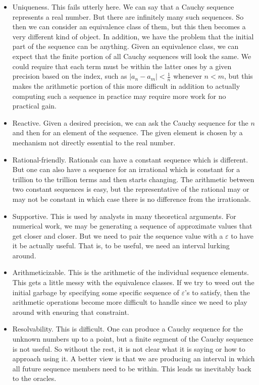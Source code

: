 \documentclass[12pt]{article}
\theoremstyle{remark}
\begin{document}
\begin{itemize}
    \item Uniqueness. This fails utterly here. We can say that a Cauchy sequence represents a real number. But there are infinitely many such sequences. So then we can consider an equivalence class of them, but this then becomes a very different kind of object. In addition, we have the problem that the initial part of the sequence can be anything. Given an equivalence class, we can expect that the finite portion of all Cauchy sequences will look the same. We could require that each term must be within the latter ones by a given precision based on the index, such as $|a_n - a_m| < \tfrac{1}{n}$ whenever $n < m$, but this makes the arithmetic portion of this more difficult in addition to actually computing such a sequence in practice may require more work for no practical gain. 
    \item Reactive. Given a desired precision, we can ask the Cauchy sequence for the $n$ and then for an element of the sequence. The given element is chosen by a mechanism not directly essential to the real number. 
    \item Rational-friendly. Rationals can have a constant sequence which is different. But one can also have a sequence for an irrational which is constant for a trillion to the trillion terms and then starts changing. The arithmetic between two constant sequences is easy, but the representative of the rational may or may not be constant in which case there is no difference from the irrationals.   
    \item Supportive. This is used by analysts in many theoretical arguments. For numerical work, we may be generating a sequence of approximate values that get closer and closer. But we need to pair the sequence value with a $\varepsilon$ to have it be actually useful. That is, to be useful, we need an interval lurking around. 
    \item Arithmeticizable. This is the arithmetic of the individual sequence elements. This gets a little messy with the equivalence classes. If we try to weed out the initial garbage by specifying some specific sequence of $\varepsilon$'s to satisfy, then the arithmetic operations become more difficult to handle since we need to play around with ensuring that constraint.  
    \item Resolvability. This is difficult. One can produce a Cauchy sequence for the unknown numbers up to a point, but a finite segment of the Cauchy sequence is not useful. So without the rest, it is not clear what it is saying or how to approach using it. A better view is that we are producing an interval in which all future sequence members need to be within. This leads us inevitably back to the oracles. 
\end{itemize}
\end{document}
